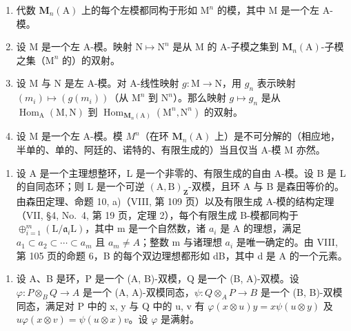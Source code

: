 \begin{enumerate}
\def\labelenumi{\alph{enumi})}
\item
  代数 \(\mathbf{M}_n(\mathrm{A})\) 上的每个左模都同构于形如 \(\mathrm{M}^n\) 的模，其中 \(\mathrm{M}\) 是一个左 A-模。
\item
  设 \(\mathrm{M}\) 是一个左 A-模。映射 \(\mathrm{N} \mapsto \mathrm{N}^n\) 是从 \(\mathrm{M}\) 的 A-子模之集到 \(\mathbf{M}_n(\mathrm{A})\)-子模之集（\(\mathrm{M}^n\) 的）的双射。
\item
  设 M 与 N 是左 A-模。对 A-线性映射 \(g: \mathrm{M} \to \mathrm{N}\)，用 \(g_{n}\) 表示映射 \((m_{i}) \mapsto (g(m_{i}))\)（从 \(\mathrm{M}^{n}\) 到 \(\mathrm{N}^{n}\)）。那么映射 \(g \mapsto g_{n}\) 是从 \(\operatorname{Hom}_{\mathrm{A}}(\mathrm{M}, \mathrm{N})\) 到 \(\operatorname{Hom}_{\mathbf{M}_{n}(\mathrm{A})}(\mathrm{M}^{n}, \mathrm{N}^{n})\) 的双射。
\item
  设 M 是一个左 A-模。模 \(M^{n}\)（在环 \(\mathbf{M}_{n}(\mathrm{A})\) 上）是不可分解的（相应地，半单的、单的、阿廷的、诺特的、有限生成的）当且仅当 A-模 M 亦然。
\end{enumerate}

\begin{enumerate}
\def\labelenumi{\arabic{enumi})}
\setcounter{enumi}{2}
\tightlist
\item
  设 A 是一个主理想整环，L 是一个非零的、有限生成的自由 A-模。设 B 是 L 的自同态环；则 L 是一个可逆 \((\mathrm{A},\mathrm{B})_{\mathbf{Z}}\)-双模，且环 A 与 B 是森田等价的。由森田定理、命题 10, a)（VIII, 第 109 页）以及有限生成 A-模的结构定理（VII, §4, No.~4, 第 19 页，定理 2），每个有限生成 B-模都同构于 \(\oplus_{i=1}^{m}(\mathrm{L}/\mathfrak{a}_{i}\mathrm{L})\)，其中 m 是一个自然数，诸 \(a_{i}\) 是 A 的理想，满足 \(a_{1} \subset a_{2} \subset \cdots \subset a_{m}\) 且 \(a_{m} \neq A\)；整数 m 与诸理想 \(a_{i}\) 是唯一确定的。由 VIII, 第 105 页的命题 6，B 的每个双边理想都形如 dB，其中 d 是 A 的一个元素。
\end{enumerate}


\begin{enumerate}
\def\labelenumi{\arabic{enumi})}
\tightlist
\item
  设 A、B 是环，P 是一个 (A, B)-双模，Q 是一个 (B, A)-双模。设 \(\varphi: P \otimes_{B} Q \to A\) 是一个 (A, A)-双模同态，\(\psi: Q \otimes_{A} P \to B\) 是一个 (B, B)-双模同态，满足对 P 中的 x, y 与 Q 中的 u, v 有 \(\varphi(x \otimes u)y = x\psi(u \otimes y)\) 及 \(u\varphi(x \otimes v) = \psi(u \otimes x)v\)。设 \(\varphi\) 是满射。
\end{enumerate}

